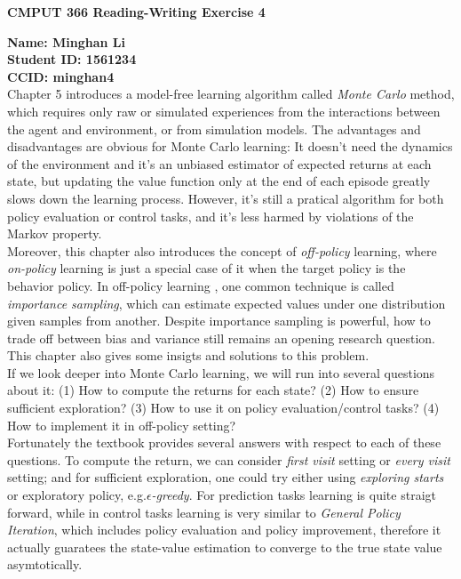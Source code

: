 \documentclass[12pt,a4paper]{article}
\begin{document}
\centerline{\large{\textbf{CMPUT 366 Reading-Writing Exercise 4}}}

\noindent \textbf{Name: Minghan Li}\\
\textbf{Student ID: 1561234}\\
\textbf{CCID: minghan4}\\

Chapter 5 introduces a model-free learning algorithm called \textit{Monte Carlo} method, which requires only raw or simulated experiences from the interactions between the agent and environment, or from simulation models. The advantages and disadvantages are obvious for Monte Carlo learning: It doesn't need the dynamics of the environment and it's an unbiased estimator of expected returns at each state, but updating the value function only at the end of each episode greatly slows down the learning process. However, it's still a pratical algorithm for both policy evaluation or control tasks, and it's less harmed by violations of the Markov property.\\

Moreover, this chapter also introduces the concept of \textit{off-policy} learning, where \textit{on-policy} learning is just a special case of it when the target policy is the behavior policy. In off-policy learning , one common technique is called \textit{importance sampling}, which can estimate expected values under one distribution given samples from another. Despite importance sampling is powerful, how to trade off between bias and variance still remains an opening research question. This chapter also gives some insigts and solutions to this problem.\\

If we look deeper into Monte Carlo learning, we will run into several questions about it:
(1) How to compute the returns for each state?
(2) How to ensure sufficient exploration?
(3) How to use it on policy evaluation/control tasks?
(4) How to implement it in off-policy setting?\\

Fortunately the textbook provides several answers with respect to each of these questions. To compute the return, we can consider \textit{first visit} setting or \textit{every visit} setting; and for sufficient exploration, one could try either using \textit{exploring starts} or exploratory policy, e.g.\textit{$\epsilon$-greedy}. For prediction tasks learning is quite straigt forward, while in control tasks learning is very similar to \textit{General Policy Iteration}, which includes policy evaluation and policy improvement, therefore it actually guaratees the state-value estimation to converge to the true state value asymtotically.\\
\end{document}
